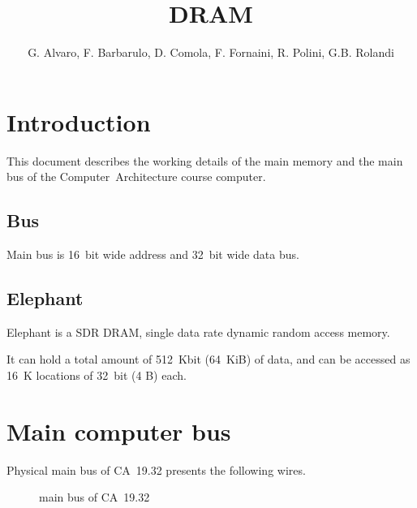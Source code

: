 \documentclass[a4paper,12pt]{article}
\title{\memoryname{} DRAM}
\author{G. Alvaro, F. Barbarulo, D. Comola, F. Fornaini, R. Polini, G.B. Rolandi}
\makeatletter
\newcommand*{\textoverline}[1]{$\overline{\hbox{#1}}\m@th$}
\newcommand{\computername}{CA~19.32}
\newcommand{\memoryname}{Elephant}
\makeatother
\begin{document}
\maketitle
\tableofcontents

\clearpage

\section{Introduction}

This document describes the working details of the main memory and the main bus of the Computer~Architecture course computer.

\subsection{Bus}
Main bus is 16~bit wide address and 32~bit wide data bus.

\subsection{\memoryname{}}
\memoryname{} is a SDR DRAM, single data rate dynamic random access memory.

It can hold a total amount of 512~Kbit (64~KiB) of data, and can be accessed as 16~K locations of 32~bit (4 B) each.

\section{Main computer bus}
Physical main bus of \computername{} presents the following wires.

\begin{figure}[H]
\centering
{}
\caption{main bus of \computername{}}
\end{figure}
\end{document}
